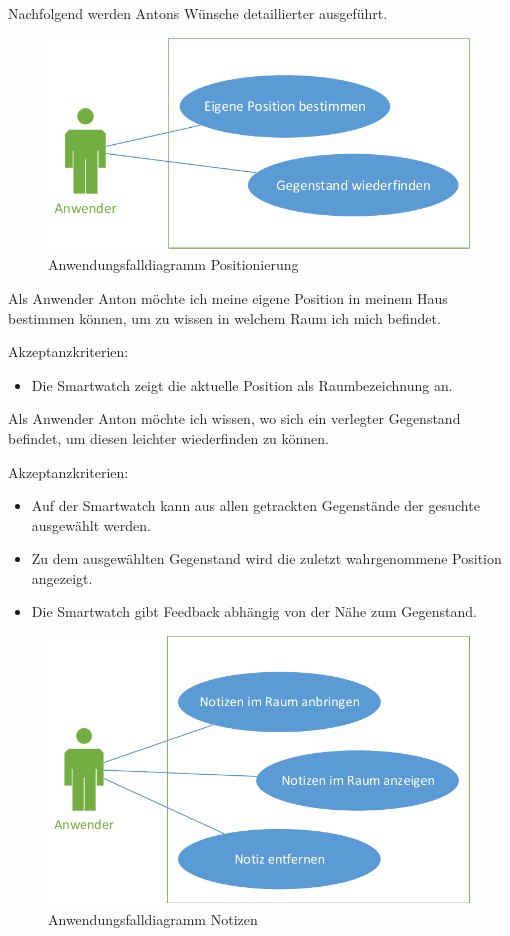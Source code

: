 Nachfolgend werden Antons Wünsche detaillierter ausgeführt.

\begin{figure}[H]
\centering
\includegraphics[width=0.7\linewidth]{Bilder/UseCase-Position}
\caption{Anwendungsfalldiagramm Positionierung}
\label{fig:UseCase-Position}
\end{figure}

Als Anwender Anton möchte ich meine eigene Position in meinem Haus bestimmen können, um zu wissen in welchem Raum ich mich befindet. 

Akzeptanzkriterien:
\begin{itemize}
\item Die Smartwatch zeigt die aktuelle Position als Raumbezeichnung an.
\end{itemize}

Als Anwender Anton möchte ich wissen, wo sich ein verlegter Gegenstand befindet, um diesen leichter wiederfinden zu können.

Akzeptanzkriterien:
\begin{itemize}
\item Auf der Smartwatch kann aus allen getrackten Gegenstände der gesuchte ausgewählt werden.
\item Zu dem ausgewählten Gegenstand wird die zuletzt wahrgenommene Position angezeigt.
\item Die Smartwatch gibt Feedback abhängig von der Nähe zum Gegenstand.
\end{itemize}


\begin{figure}[H]
\centering
\includegraphics[width=0.7\linewidth]{Bilder/UseCase-Notizen}
\caption{Anwendungsfalldiagramm Notizen}
\label{fig:UseCase-Notizen}
\end{figure}

